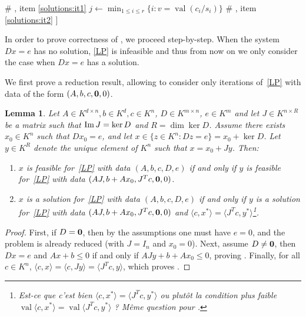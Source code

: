 \documentclass[a4paper,oneside,11pt]{article}
\newtheorem{lemma}[theorem]{Lemma}
\newcommand{\simone}[1]{{\color{blue} #1}} %
\DeclareMathOperator{\val}{val}
\newcommand{\OK}{\mathcal{O}_K}
\begin{document}
\begin{algorithm}
\begin{algorithmic}[1]
            \RETURN [FEAS, $y$] \hfill {\color{olive} \# , item \ref{solutions:it1}}
          \ELSE
          \STATE $j \leftarrow \min_{1 \leq i \leq r} \{i : v = \val (c_i/s_i)\}$
            \RETURN [FEAS, ${\bf e}_j$] \hfill {\color{olive} \# , item \ref{solutions:it2}}
          \ENDIF
        \ENDIF 
      \ENDIF 
      \RETURN [INFEAS, []] \label{step:core:end}
    \end{algorithmic}
\end{algorithm}

In order to prove correctness of , we proceed step-by-step.
When the system $Dx=e$ has no solution, \eqref{LP} is infeasible and
thus from now on we only consider the case when $Dx=e$ has a solution.

We first prove a reduction result, allowing to consider only iterations
of~\eqref{LP} with data of the form $(A,b,c,{\bf 0},0)$.

\begin{lemma}\label{reducD}
  Let $A \in K^{d \times n}, b \in K^d, c\in K^n$, $D \in K^{m\times n}$,
  $e \in K^m$ and let $J \in K^{n \times R}$ be a matrix such that
  ${\rm Im}\, J = \ker D$ and $R = \dim \ker D$.
  Assume there exists $x_0 \in K^n$ such that $D x_0 = e$, and let
  $x \in \{z \in K^n : Dz = e\} = x_0 + \ker D$.
  Let $y \in K^R$ denote the unique element of $K^n$ such that
  $x = x_0 + J y$. Then:
  \begin{enumerate}
  \item\label{reducD_item1}
    $x$ is feasible for~\eqref{LP} with data $(A,b,c,D,e)$ if and only if 
    $y$ is feasible for~\eqref{LP} with data $(AJ,b+A x_0,J^T c,{\bf 0},0)$.
  \item\label{reducD_item2}
    $x$ is a solution for~\eqref{LP} with data $(A,b,c,D,e)$ if and only if 
    $y$ is a solution for~\eqref{LP} with data $(AJ,b+A x_0,J^T c,{\bf 0},0)$ and
    $\langle c,x^* \rangle = \langle J^T c,y^* \rangle$\footnote{\simone{Est-ce que
    c'est bien $\langle c,x^* \rangle = \langle J^T c,y^* \rangle$ ou plutôt la condition
    plus faible $\val \langle c,x^* \rangle = \val \langle J^T c,y^* \rangle$ ?
  Même question pour \Cref{solsLP}.}}.
  \end{enumerate}
\end{lemma}
\begin{proof}
  First, if $D={\bf 0}$, then by the assumptions one must have $e=0$, and the problem
  is already reduced (with $J=I_n$ and $x_0=0$).
  Next, assume $D\neq{\bf 0}$, then $Dx=e$ and $Ax + b \le 0$ if and only if
  $AJy + b+Ax_0 \le 0$, proving . Finally, for all
  $c \in K^n$, $\langle c,x\rangle = \langle c, Jy\rangle = \langle J^T c,y\rangle$, which proves .
\end{proof}
 
\end{document}
